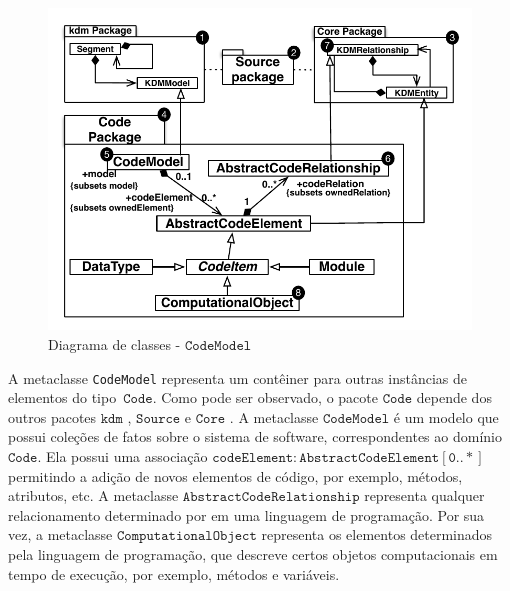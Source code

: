 \begin{figure}[!ht]
	\centering
	\includegraphics[scale=0.8]{images/codeModel}
	\caption{Diagrama de classes - $\mathtt{CodeModel}$}
	\label{fig:CodeModel}
\end{figure}

A metaclasse \texttt{CodeModel} representa um contêiner para outras instâncias de elementos do tipo~$\mathtt{Code}$. Como pode ser observado, o pacote $\mathtt{Code}$  depende dos outros pacotes $\mathtt{kdm}$ , $\mathtt{Source}$  e $\mathtt{Core}$ . A metaclasse $\mathtt{CodeModel}$  é um modelo que possui coleções de fatos sobre o sistema de software, correspondentes ao domínio $\mathtt{Code}$. Ela possui uma associação  $\mathtt{codeElement:AbstractCodeElement[0..*]}$ permitindo a adição de novos elementos de código, por exemplo, métodos, atributos, etc. A metaclasse  $\mathtt{AbstractCodeRelationship}$  representa qualquer relacionamento determinado por em uma linguagem de programação. Por sua vez, a metaclasse $\mathtt{ComputationalObject}$ representa os elementos determinados pela linguagem de programação, que descreve certos objetos computacionais em tempo de execução, por exemplo, métodos e variáveis.

